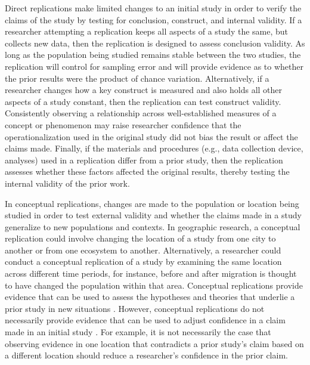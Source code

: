 \documentclass[]{interact}
\theoremstyle{plain}%
\theoremstyle{definition}
\theoremstyle{remark}
\begin{document}
Direct replications make limited changes to an initial study in order to verify the claims of the study by testing for conclusion, construct, and internal validity. 
If a researcher attempting a replication keeps all aspects of a study the same, but collects new data, then the replication is designed to assess conclusion validity.
As long as the population being studied remains stable between the two studies, the replication will control for sampling error and will provide evidence as to whether the prior results were the product of chance variation. 
Alternatively, if a researcher changes how a key construct is measured and also holds all other aspects of a study constant, then the replication can test construct validity.
Consistently observing a relationship across well-established measures of a concept or phenomenon may raise researcher confidence that the operationalization used in the original study did not bias the result or affect the claims made. 
Finally, if the materials and procedures (e.g., data collection device, analyses) used in a replication differ from a prior study, then the replication assesses whether these factors affected the original results, thereby testing the internal validity of the prior work. 

In conceptual replications, changes are made to the population or location being studied in order to test external validity and whether the claims made in a study generalize to new populations and contexts. 
In geographic research, a conceptual replication could involve changing the location of a study from one city to another or from one ecosystem to another. 
Alternatively, a researcher could conduct a conceptual replication of a study by examining the same location across different time periods, for instance, before and after migration is thought to have changed the population within that area. 
Conceptual replications provide evidence that can be used to assess the hypotheses and theories that underlie a prior study in new situations \citep{schmidt2009}.
However, conceptual replications do not necessarily provide evidence that can be used to adjust confidence in a claim made in an initial study \citep{nosek2020}.
For example, it is not necessarily the case that observing evidence in one location that contradicts a prior study's claim based on a different location should reduce a researcher's confidence in the prior claim.
\end{document}
